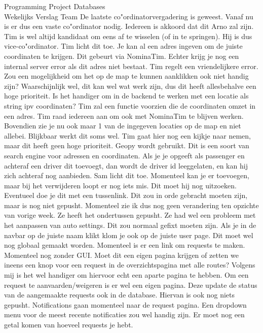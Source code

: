 \documentclass{article}
\newcounter{team}
\begin{document}
\begin{Minutes}{Programming Project Databases \\ Wekelijks Verslag Team }
				    De laatste co"ordinatorvergadering is geweest. Vanaf nu is er dus een vaste co"ordinator nodig. Iedereen is akkoord dat dit Arno zal zijn. Tim is wel altijd kandidaat om eens af te wisselen (of in te springen). Hij is dus vice-co"ordinator.
				    Tim licht dit toe. Je kan al een adres ingeven om de juiste coordinaten te krijgen. Dit gebeurt via NominaTim. Echter krijg je nog een internal server error als dit adres niet bestaat. Tim regelt een vriendelijkere error. Zou een mogelijkheid om het op de map te kunnen aanklikken ook niet handig zijn? Waarschijnlijk wel, dit kan wel wat werk zijn, dus dit heeft allesbehalve een hoge prioriteit. Is het handiger om in de backend te werken met een locatie als string ipv coordinaten? Tim zal een functie voorzien die de coordinaten omzet in een adres. Tim raad iedereen aan om ook met NominaTim te blijven werken. Bovendien zie je nu ook maar 1 van de ingegeven locaties op de map en niet allebei. Blijkbaar werkt dit soms wel. Tim gaat hier nog een kijkje naar nemen, maar dit heeft geen hoge prioriteit. Geopy wordt gebruikt. Dit is een soort van search engine voor adressen en coordinaten. Als je je opgeeft als passenger en achteraf een driver dit toevoegt, dan wordt de driver id leeggelaten, en kan hij zich achteraf nog aanbieden.
			        Sam licht dit toe. Momenteel kan je er toevoegen, maar bij het verwijderen loopt er nog iets mis. Dit moet hij nog uitzoeken. Eventueel doe je dit met een tussenlink.
			        Dit zou in orde gebracht moeten zijn, maar is nog niet gepusht. Momenteel zie ik dus nog geen verandering ten opzichte van vorige week. Ze heeft het ondertussen gepusht. Ze had wel een probleem met het aanpassen van auto settings. Dit zou normaal gefixt moeten zijn. Als je in de navbar op de juiste naam klikt klom je ook op de juiste user page. Dit moet wel nog globaal gemaakt worden.
					Momenteel is er een link om requests te maken. Momenteel nog zonder GUI. Moet dit een eigen pagina krijgen of zetten we ineens een knop voor een request in de overzichtspagina met alle routes? Volgens mij is het wel handiger om hiervoor echt een aparte pagina te hebben.
					Om een request te aanvaarden/weigeren is er wel een eigen pagina. Deze update de status van de aangemaakte requests ook in de database.
				    Hiervan is ook nog niets gepusht. Notifications gaan momenteel naar de request pagina. Een dropdown menu voor de meest recente notificaties zou wel handig zijn. Er moet nog een getal komen van hoeveel requests je hebt.

\end{Minutes}
\end{document}

